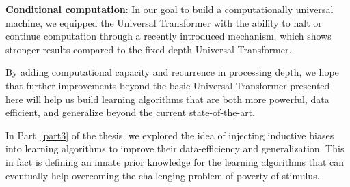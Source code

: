 \textbf{Conditional computation}: In our goal to build a computationally universal machine, we equipped the Universal Transformer with the ability to halt or continue computation through a recently introduced mechanism, which shows stronger results compared to the fixed-depth Universal Transformer.

By adding computational capacity and recurrence in processing depth, we hope that further improvements beyond the basic Universal Transformer presented here will help us build learning algorithms that are both more powerful, data efficient, and generalize beyond the current state-of-the-art.

In Part~\ref{part3} of the thesis, we explored the idea of injecting inductive biases into learning algorithms to improve their data-efficiency and generalization. This in fact is defining an innate prior knowledge for the learning algorithms that can eventually help overcoming the challenging problem of poverty of stimulus.

